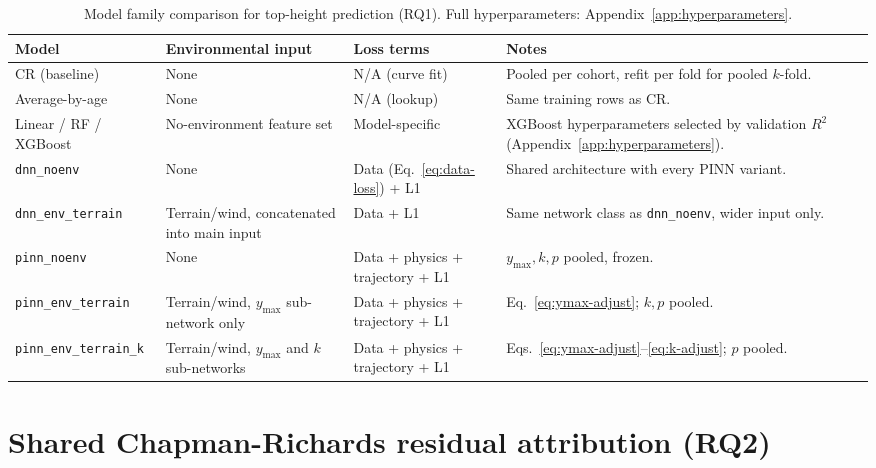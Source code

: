 \documentclass[11pt,a4paper]{report}
\begin{document}
\begin{table}[!htbp]
\centering
\scriptsize
\renewcommand{\arraystretch}{1.2}
\begin{tabular}{p{2.3cm}p{3cm}p{2.6cm}p{4.5cm}}
\toprule
Model & Environmental input & Loss terms & Notes \\
\midrule
CR (baseline) & None & N/A (curve fit) & Pooled per cohort, refit per fold for pooled $k$-fold. \\
Average-by-age & None & N/A (lookup) & Same training rows as CR. \\
Linear / RF / XGBoost & No-environment feature set & Model-specific & XGBoost hyperparameters
selected by validation $R^2$ (Appendix~\ref{app:hyperparameters}). \\
\texttt{dnn\_noenv} & None & Data (Eq.~\ref{eq:data-loss}) + L1 & Shared architecture with every
PINN variant. \\
\texttt{dnn\_env\_terrain} & Terrain/wind, concatenated into main input & Data + L1 & Same network
class as \texttt{dnn\_noenv}, wider input only. \\
\texttt{pinn\_noenv} & None & Data + physics + trajectory + L1 & $y_{\max},k,p$ pooled, frozen. \\
\texttt{pinn\_env\_terrain} & Terrain/wind, $y_{\max}$ sub-network only & Data + physics +
trajectory + L1 & Eq.~\ref{eq:ymax-adjust}; $k,p$ pooled. \\
\texttt{pinn\_env\_terrain\_k} & Terrain/wind, $y_{\max}$ and $k$ sub-networks & Data + physics +
trajectory + L1 & Eqs.~\ref{eq:ymax-adjust}--\ref{eq:k-adjust}; $p$ pooled. \\
\bottomrule
\end{tabular}
\caption{Model family comparison for top-height prediction (RQ1). Full hyperparameters:
Appendix~\ref{app:hyperparameters}.}
\label{tab:rq1-models}
\end{table}

\section{Shared Chapman-Richards residual attribution (RQ2)}
\label{sec:rq2}
\end{document}

